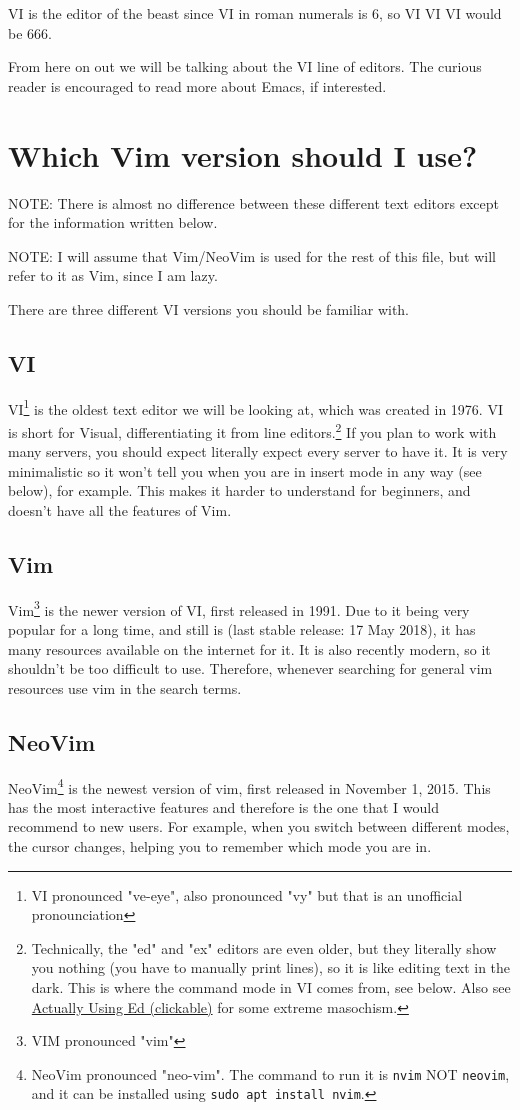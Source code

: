 \documentclass[11pt]{article}
\begin{document}
VI is the editor of the beast since VI in roman numerals is 6, so VI VI VI would
be 666.

From here on out we will be talking about the VI line of editors. The curious
reader is encouraged to read more about Emacs, if interested.
\section{Which Vim version should I use?}
\label{sec:orgd74e5eb}
NOTE: There is almost no difference between these different text editors except
for the information written below.

NOTE: I will assume that Vim/NeoVim is used for the rest of this file, but will
refer to it as Vim, since I am lazy.

There are three different VI versions you should be familiar with.
\subsection{VI}
\label{sec:org0d894a6}
VI\footnote{VI pronounced "ve-eye", also pronounced "vy" but that is an unofficial pronounciation} is the oldest text editor we will be looking at, which was created
in 1976. VI is short for Visual, differentiating it from line editors.\footnote{Technically, the "ed" and "ex" editors are even older, but they literally
show you nothing (you have to manually print lines), so it is like editing text
in the dark. This is where the command mode in VI comes from, see below. Also see
\href{https://sanctum.geek.nz/arabesque/actually-using-ed/}{Actually Using Ed (clickable)} for some extreme masochism.} If
you plan to work with many servers, you should expect literally expect every
server to have it. It is very minimalistic so it won't tell you when you are in
insert mode in any way (see below), for example. This makes it harder to
understand for beginners, and doesn't have all the features of Vim.
\subsection{Vim}
\label{sec:orgbf6c06f}
Vim\footnote{VIM pronounced "vim"} is the newer version of VI, first released in 1991. Due to it being
very popular for a long time, and still is (last stable release: 17 May 2018),
it has many resources available on the internet for it. It is also recently
modern, so it shouldn't be too difficult to use. Therefore, whenever searching
for general vim resources use vim in the search terms.
\subsection{NeoVim}
\label{sec:org119c1be}
NeoVim\footnote{NeoVim pronounced "neo-vim". The command to run it is \texttt{nvim} NOT \texttt{neovim}, and it
can be installed using \texttt{sudo apt install nvim}.} is the newest version of vim, first released in November 1, 2015.
This has the most interactive features and therefore is the one that I would
recommend to new users. For example, when you switch between different modes,
the cursor changes, helping you to remember which mode you are in.
\end{document}
